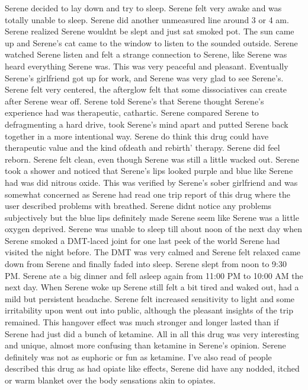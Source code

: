 \documentclass[12pt]{book}
\begin{document}
Serene decided to lay down and try to sleep. Serene felt very awake and was totally unable to sleep. Serene did another unmeasured line around 3 or 4 am. Serene realized Serene wouldnt be slept and just sat smoked pot. The sun came up and Serene's cat came to the window to listen to the sounded outside. Serene watched Serene listen and felt a strange connection to Serene, like Serene was heard everything Serene was. This was very peaceful and pleasant. Eventually Serene's girlfriend got up for work, and Serene was very glad to see Serene's. Serene felt very centered, the afterglow felt that some dissociatives can create after Serene wear off. Serene told Serene's that Serene thought Serene's experience had was therapeutic, cathartic. Serene compared Serene to defragmenting a hard drive, took Serene's mind apart and putted Serene back together in a more intentional way. Serene do think this drug could have therapeutic value and the kind ofdeath and rebirth' therapy. Serene did feel reborn. Serene felt clean, even though Serene was still a little wacked out. Serene took a shower and noticed that Serene's lips looked purple and blue like Serene had was did nitrous oxide. This was verified by Serene's sober girlfriend and was somewhat concerned as Serene had read one trip report of this drug where the user described problems with breathed. Serene didnt notice any problems subjectively but the blue lips definitely made Serene seem like Serene was a little oxygen deprived. Serene was unable to sleep till about noon of the next day when Serene smoked a DMT-laced joint for one last peek of the world Serene had visited the night before. The DMT was very calmed and Serene felt relaxed came down from Serene and finally faded into sleep. Serene slept from noon to 9:30 PM. Serene ate a big dinner and fell asleep again from 11:00 PM to 10:00 AM the next day. When Serene woke up Serene still felt a bit tired and waked out, had a mild but persistent headache. Serene felt increased sensitivity to light and some irritability upon went out into public, although the pleasant insights of the trip remained. This hangover effect was much stronger and longer lasted than if Serene had just did a bunch of ketamine. All in all this drug was very interesting and unique, almost more confusing than ketamine in Serene's opinion. Serene definitely was not as euphoric or fun as ketamine. I've also read of people described this drug as had opiate like effects, Serene did have any nodded, itched or warm blanket over the body sensations akin to opiates.
\end{document}
